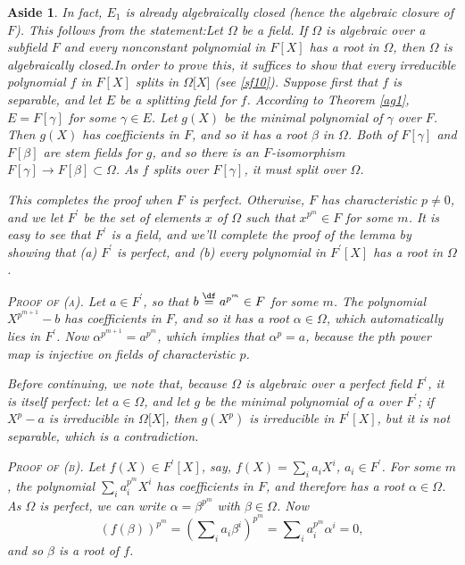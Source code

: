 \documentclass[a4paper,11pt,final,openany]{memoir}
\newtheorem{aside}[X]{Aside}
\theoremstyle{nonumberplain}
\begin{document}
\begin{aside}
\label{sf15a}In fact, $E_{1}$ is already algebraically closed (hence the
algebraic closure of $F$). This follows from the statement:\bquote Let
$\Omega$ be a field. If $\Omega$ is algebraic over a subfield $F$ and every
nonconstant polynomial in $F[X]$ has a root in $\Omega$, then $\Omega$ is
algebraically closed.\equote In order to prove this, it suffices to show that
every irreducible polynomial $f$ in $F[X]$ splits in $\Omega\lbrack X]$ (see
\ref{sf10}). Suppose first that $f$ is separable, and let $E$ be a splitting
field for $f$. According to Theorem \ref{ag1}, $E=F[\gamma]$ for some
$\gamma\in E$. Let $g(X)$ be the minimal polynomial of $\gamma$ over $F$. Then
$g(X)$ has coefficients in $F$, and so it has a root $\beta$ in $\Omega$. Both
of $F[\gamma]$ and $F[\beta]$ are stem fields for $g$, and so there is an
$F$-isomorphism $F[\gamma]\rightarrow F[\beta]\subset\Omega$. As $f$ splits
over $F[\gamma]$, it must split over $\Omega$.

This completes the proof when $F$ is perfect. Otherwise, $F$ has
characteristic $p\neq0$, and we let $F^{\prime}$ be the set of elements $x$ of
$\Omega$ such that $x^{p^{m}}\in F$ for some $m$. It is easy to see that
$F^{\prime}$ is a field, and we'll complete the proof of the lemma by showing
that (a) $F^{\prime}$ is perfect, and (b) every polynomial in $F^{\prime}[X]$
has a root in $\Omega$.

\textsc{Proof of \textup{(a)}.} Let $a\in F^{\prime}$, so that
$b\overset{\df}{=}a^{p^{m}}\in F$ for some $m$. The
polynomial $X^{p^{m+1}}-b$ has coefficients in $F$, and so it has a root
$\alpha\in\Omega$, which automatically lies in $F^{\prime}$. Now
$\alpha^{p^{m+1}}=a^{p^{m}}$, which implies that $\alpha^{p}=a$, because the
$p$th power map is injective on fields of characteristic $p$.

Before continuing, we note that, because $\Omega$ is algebraic over a perfect
field $F^{\prime}$, it is itself perfect: let $a\in\Omega$, and let $g$ be the
minimal polynomial of $a$ over $F^{\prime}$; if $X^{p}-a$ is irreducible in
$\Omega\lbrack X]$, then $g(X^{p})$ is irreducible in $F^{\prime}[X]$, but it
is not separable, which is a contradiction.

\textsc{Proof of \textup{(b)}.} Let $f(X)\in F^{\prime}[X]$, say,
$f(X)=\sum_{i}a_{i}X^{i}$, $a_{i}\in F^{\prime}$. For some $m$, the polynomial
$\sum_{i}a_{i}^{p^{m}}X^{i}$ has coefficients in $F$, and therefore has a root
$\alpha\in\Omega$. As $\Omega$ is perfect, we can write $\alpha=\beta^{p^{m}}$
with $\beta\in\Omega$. Now%
\[
\left(  f(\beta)\right)  ^{p^{m}}=\left(  \sum\nolimits_{i}a_{i}\beta
^{i}\right)  ^{p^{m}}=\sum\nolimits_{i}a_{i}^{p^{m}}\alpha^{i}=0,
\]
and so $\beta$ is a root of $f$.
\end{aside}
\end{document}

